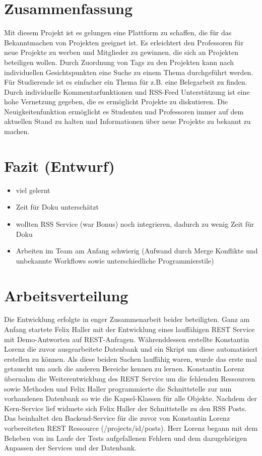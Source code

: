 \documentclass[12pt]{scrartcl}
\begin{document}
	\section{Zusammenfassung}
	Mit diesem Projekt ist es gelungen eine Plattform zu schaffen, die für das Bekanntmachen von Projekten geeignet ist. Es erleichtert den Professoren für neue Projekte zu werben und Mitglieder zu gewinnen, die sich an Projekten beteiligen wollen. Durch Zuordnung von Tags zu den Projekten kann nach individuellen Gesichtspunkten eine Suche zu einem Thema durchgeführt werden. Für Studierende ist es einfacher ein Thema für z.B. eine Belegarbeit zu finden. Durch individuelle Kommentarfunktionen und RSS-Feed Unterstützung ist eine hohe Vernetzung gegeben, die es ermöglicht Projekte zu diskutieren. Die Neuigkeitenfunktion ermöglicht es Studenten und Professoren immer auf dem aktuellen Stand zu halten und Informationen über neue Projekte zu bekannt zu machen. 
	\section{Fazit (Entwurf)}
		\begin{itemize}
			\item viel gelernt
			\item Zeit für Doku unterschätzt
			\item wollten RSS Service (war Bonus) noch integrieren, dadurch zu wenig Zeit für Doku
			\item Arbeiten im Team am Anfang schwierig (Aufwand durch Merge Konflikte und unbekannte Workflows sowie unterschiedliche Programmierstile)
		\end{itemize}
		
	\section{Arbeitsverteilung}
		
		Die Entwicklung erfolgte in enger Zusammenarbeit beider beteiligten. Ganz am Anfang startete Felix Haller mit der Entwicklung eines lauffähigen REST Service mit Demo-Antworten auf REST-Anfragen. Währenddessen erstellte Konstantin Lorenz die zuvor ausgearbeitete Datenbank und ein Skript um diese automatisiert erstellen zu können. Als diese beiden Sachen lauffähig waren, wurde das erste mal getauscht um auch die anderen Bereiche kennen zu lernen. Konstantin Lorenz übernahm die Weiterentwicklung des REST Service um die fehlenden Ressourcen sowie Methoden und Felix Haller programmierte die Schnittstelle zur nun vorhandenen Datenbank so wie die Kapsel-Klassen für alle Objekte.
		Nachdem der Kern-Service lief widmete sich Felix Haller der Schnittstelle zu den RSS Posts. Das beinhaltet den Backend-Service für die zuvor von Konstantin Lorenz vorbereiteten REST Ressource (/projects/{id}/posts). Herr Lorenz begann mit dem Beheben von im Laufe der Tests aufgefallenen Fehlern und dem dazugehörigen Anpassen der Services und der Datenbank.
		
\end{document}
